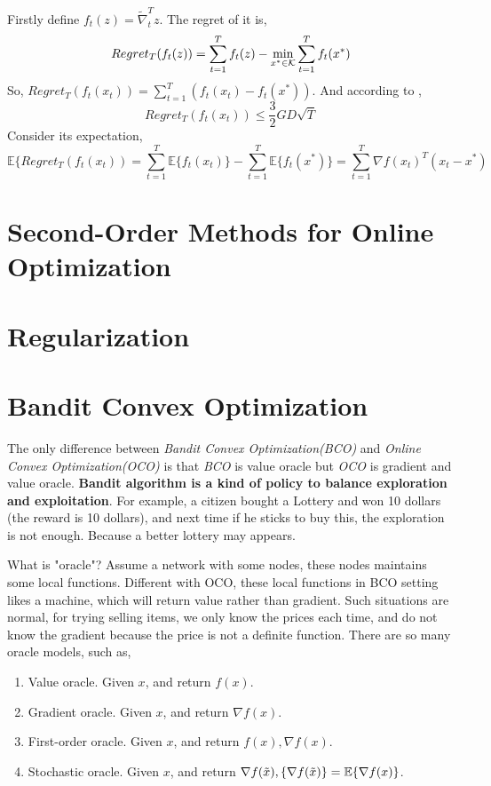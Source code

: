 			\begin{framed} \label{CoSGD 2} 
				Firstly define $f_t(z) = \tilde{\nabla}_t^Tz$. The regret of it is,
				$$
				Regret_T(f_t(z)) = \sum_{t=1}^Tf_t(z) - \min_{x^*\in\mathcal{K}}\sum_{t=1}^Tf_t(x^*)$$
				So, $Regret_T(f_t(x_t)) = \sum_{t=1}^T(f_t(x_t)-f_t(x^*))$.
				And according to ,
				$$
				Regret_T(f_t(x_t)) \le\frac{3}{2}GD\sqrt{T}
				$$
				Consider its expectation,
				$$
				\mathbb{E}\{Regret_T(f_t(x_t)) = \sum_{t=1}^T \mathbb{E}\{f_t(x_t)\} - \sum_{t=1}^T\mathbb{E}\{f_t(x^*)\} =  \sum_{t=1}^T \nabla f(x_t)^T(x_t-x^*)
				$$
			\end{framed}
		
		
		
	\section{Second-Order Methods for Online Optimization}
	
	
	\section{Regularization}
	
	\section{Bandit Convex Optimization}
	The only difference between \emph{Bandit Convex Optimization(BCO)} and \emph{Online Convex Optimization(OCO)} is that \emph{BCO} is value oracle but \emph{OCO} is gradient and value oracle. \textbf{Bandit algorithm is a kind of policy to balance exploration and exploitation}\cite{anshitou2021banditzhishifenxiangyuzongjie}. For example, a citizen bought a Lottery and won 10 dollars (the reward is 10 dollars), and next time if he sticks to buy this, the exploration is not enough. Because a better lottery may appears. 
		\begin{remark}{What is "oracle"?}{}
			Assume a network with some nodes, these nodes maintains some local functions. Different with OCO, these local functions in BCO setting likes a machine, which will return value rather than gradient. Such situations are normal, for trying selling items, we only know the prices each time, and do not know the gradient because the price is not a definite function. There are so many oracle models, such as,
			\begin{enumerate}
				\item Value oracle. Given $x$, and return $f(x)$.
				\item Gradient oracle. Given $x$, and return $\nabla f(x)$.
				\item First-order oracle. Given $x$, and return $f(x),\nabla f(x)$.
				\item Stochastic oracle. Given $x$, and return $\nabla f(\tilde x),\mathbb\{\nabla f(\tilde x)\}=\mathbb{E}\{\nabla f(x)\}$.
			\end{enumerate}
		\end{remark}
	
	\ifx\allfiles\undefined

\fi